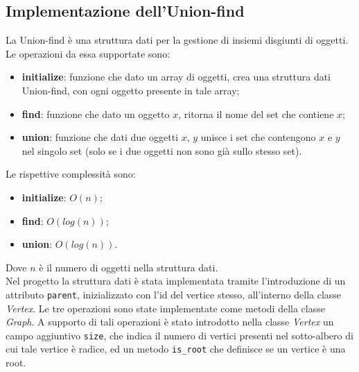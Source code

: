 \subsection{Implementazione dell'Union-find}
La Union-find è una struttura dati per la gestione di insiemi disgiunti di oggetti. Le operazioni da essa supportate sono:
\begin{itemize}
	\item \textbf{initialize}: funzione che dato un array di oggetti, crea una struttura dati Union-find, con ogni oggetto presente in tale array;
	\item \textbf{find}: funzione che dato un oggetto $x$, ritorna il nome del set che contiene $x$;
	\item \textbf{union}: funzione che dati due oggetti $x$, $y$ unisce i set che contengono $x$ e $y$ nel singolo set (solo se i due oggetti non sono già sullo stesso set).
\end{itemize}
Le rispettive complessità sono:
\begin{itemize}
	\item \textbf{initialize}: $O(n)$;
	\item \textbf{find}: $O(log(n))$;
	\item \textbf{union}: $O(log(n))$.
\end{itemize}
Dove $n$ è il numero di oggetti nella struttura dati. \\
Nel progetto la struttura dati è stata implementata tramite l'introduzione di un attributo \texttt{parent}, inizializzato con l'id del vertice stesso, all'interno della classe \textit{Vertex}. Le tre operazioni sono state implementate come metodi della classe \textit{Graph}. A supporto di tali operazioni è stato introdotto nella classe \textit{Vertex} un campo aggiuntivo \texttt{size}, che indica il numero di vertici presenti nel sotto-albero di cui tale vertice è radice, ed un metodo \texttt{is\_root} che definisce se un vertice è una root.
